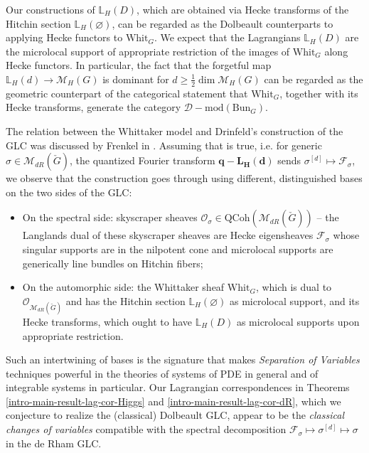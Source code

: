 \documentclass[twoside, 11pt]{article}
\numberwithin{equation}{section}
\theoremstyle{theorem}
\numberwithin{theorem}{section}
\theoremstyle{definition}
\begin{document}
Our constructions of $\mathbb{L}_H(D)$, which are obtained via Hecke transforms of the Hitchin section $\mathbb{L}_H(\varnothing)$, can be regarded as the Dolbeault counterparts to applying Hecke functors to $\mathrm{Whit}_{G}$. 
We expect that the Lagrangians $\mathbb{L}_H(D)$ are the microlocal support of appropriate restriction of the images of $\mathrm{Whit}_{G}$ along Hecke functors.
In particular, the fact that the forgetful map $\mathbb{L}_H(d) \rightarrow \mathcal{M}_H(G)$ is dominant for $d \geq \frac{1}{2} \dim \mathcal{M}_H(G)$ can be regarded as the geometric counterpart of the categorical statement that $\mathrm{Whit}_{G}$, together with its Hecke transforms, generate the category $\mathcal{D}-\mathrm{mod}(\mathrm{Bun}_G)$.

The relation between the Whittaker model and Drinfeld's construction of the GLC was discussed by Frenkel in \cite{Frenkel1995}. 
Assuming that  is true, i.e. for generic $\sigma \in \mathcal{M}_{dR}(\check{G})$, the quantized Fourier transform $\mathbf{q-L_H(d)}$ sends $\sigma^{[d]} \mapsto \mathcal{F}_\sigma$, we observe that the construction goes through using different, distinguished bases on the two sides of the GLC:
\begin{itemize}
    \item On the spectral side: skyscraper sheaves $\mathcal{O}_\sigma \in \mathrm{QCoh}(\mathcal{M}_{dR}(\check{G}))$ -- the Langlands dual of these skyscraper sheaves are Hecke eigensheaves $\mathcal{F}_\sigma$ whose singular supports are in the nilpotent cone and microlocal supports are generically line bundles on Hitchin fibers; 
    \item On the automorphic side: the Whittaker sheaf $\mathrm{Whit}_G$, which is dual to $\mathcal{O}_{\mathcal{M}_{dR}(\check{G})}$ and has the Hitchin section $\mathbb{L}_H(\varnothing)$ as microlocal support, and its Hecke transforms, which ought to have $\mathbb{L}_H(D)$ as microlocal supports upon appropriate restriction.
\end{itemize}
Such an intertwining of bases is the signature that makes  \textit{Separation of Variables} techniques powerful in the theories of systems of PDE in general and of integrable systems in particular.
Our Lagrangian correspondences in Theorems \ref{intro-main-result-lag-cor-Higgs} and \ref{intro-main-result-lag-cor-dR}, which we conjecture to realize the (classical) Dolbeault GLC, appear to be the \textit{classical changes of variables} compatible with the spectral decomposition $\mathcal{F}_\sigma \mapsto \sigma^{[d]} \mapsto \sigma$ in the de Rham GLC.  
\end{document}
